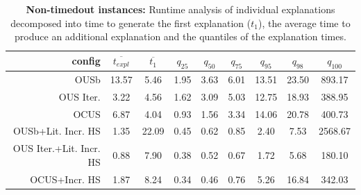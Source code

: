 \documentclass[a4paper,UKenglish,cleveref, autoref, thm-restate, pdfa]{lipics-v2021}
\begin{document}
				\begin{table}[!h]
					\centering
						\begin{tabular}{r|c|c|cccccc}
							config & $\overline{t_{expl}}$ & $\overline{t_{1}}$ &  $q_{25}$ &  $q_{50}$ &  $q_{75}$  & $q_{95}$ &  $q_{98}$ & $q_{100}$ \\\hline
							OUSb &                 13.57 &               5.46 &      1.95 &      3.63 &       6.01 &    13.51 &     23.50 &    893.17 \\
							OUS Iter. &                  3.22 &               4.56 &      1.62 &      3.09 &       5.03 &    12.75 &     18.93 &    388.95 \\
							OCUS &                  6.87 &               4.04 &      0.93 &      1.56 &       3.34 &    14.06 &     20.78 &    400.73 \\
							OUSb+Lit. Incr. HS  &                  1.35 &              22.09 &      0.45 &      0.62 &       0.85 &     2.40 &      7.53 &   2568.67 \\
							OUS Iter.+Lit. Incr. HS &                  0.88 &               7.90 &      0.38 &      0.52 &       0.67 &     1.72 &      5.68 &    180.10 \\
							OCUS+Incr. HS &                  1.87 &               8.24 &      0.34 &      0.46 &       0.76 &     5.26 &     16.84 &    342.03 \\
						\end{tabular}
					\caption{\textbf{Non-timedout instances:} Runtime analysis of individual explanations decomposed into time to generate the first explanation ($t_1$), the average time to produce an additional explanation and the quantiles of the explanation times.}
					\label{tab:indiv-explanations}
				\end{table}
				
\end{document}
